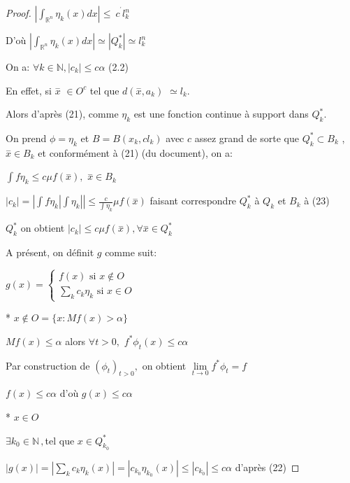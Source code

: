 \documentclass[12pt, a4paper, oneside]{article}
\begin{document}
\begin{proof}
	$\left\vert \int_{\mathbb{R}^{n}}\eta _{k}(x)dx\right\vert \leq \ c^{^{\prime }}l_{k}^{n}$
	
	D'où $\left\vert \int_{\mathbb{R}^{n}}\eta _{k}(x)dx\right\vert \simeq \left\vert Q_{k}^{\ast }\right\vert
	\simeq l_{k}^{n}$
	
	On a: $\forall k\in \mathbb{N},\left\vert c_{k}\right\vert \leq c\alpha $ (2.2)
	
	En effet, si $\overset{-}{x}$ $\in O^{c}$ tel que $d(\overset{-}{x},a_{k})$ $
	\simeq l_{k}.$
	
	Alors d'après (21), comme  $\eta _{k}$ est une fonction continue à support dans $Q_{k}^{\ast }.$
	
	On prend $\phi =\eta _{k}$ et $B=B(x_{k},cl_{k})$ avec $c$ assez grand de sorte que $Q_{k}^{\ast }\subset B_{k}$ , $\overset{-}{x}\in B_{k}$ et conformément à (21) (du document), on a:
	
	$\int f\eta _{k}\leq c\mu f(\overset{-}{x}),$ $\overset{-}{x}\in B_{k}$
	
	$\left\vert c_{k}\right\vert =\left\vert \int f\eta _{k}\left\vert \int
	\eta _{k}\right\vert \right\vert \leq \frac{c}{\int \eta _{k}}\mu f(\overset
	{-}{x})$ faisant correspondre $Q_{k}^{\ast }$ à $Q_{k}$ et $B_{k}$ à (23)
	
	$Q_{k}^{\ast }$ on obtient $\left\vert c_{k}\right\vert \leq c\mu f(\overset{
		-}{x}),\forall \overset{-}{x}\in Q_{k}^{\ast }$
	
	A présent, on définit $g$ comme suit:
	
	$g(x)=\left\{ 
	\begin{array}{c}
		f(x)\text{ si }x\notin O \\ 
		\sum\limits_{k}c_{k}\eta _{k}\text{ si }x\in O
	\end{array}
	\right. $
	
	* $x\notin O=\{x:Mf(x)>\alpha \}$
	
	$Mf(x)\leq \alpha $ alors $\forall t>0,$ $f^{\ast }\phi _{t}(x)\leq c\alpha $
	
	Par construction de $(\phi _{t})_{t>0},$ on obtient $\underset{
		t\longrightarrow 0}{\lim }f^{\ast }\phi _{t}=f$
	
	$f(x)\leq c\alpha $ d'où $g(x)\leq c\alpha $
	
	* $x\in O$
	
	$\exists k_{0}\in \mathbb{N}\,,$tel que $x\in Q_{k_{0}}^{\ast }$
	
	$\left\vert g(x)\right\vert =\left\vert \sum\limits_{k}c_{k}\eta
	_{k}(x)\right\vert =\left\vert c_{k_{0}}\eta _{k_{0}}(x)\right\vert \leq
	\left\vert c_{k_{0}}\right\vert \leq c\alpha $ d'après (22)
	

\end{proof}
\end{document}
